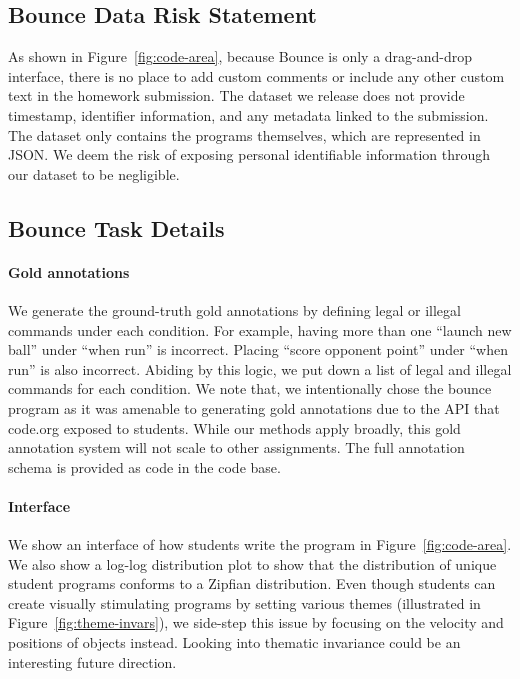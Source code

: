 \documentclass{article}
\begin{document}
\subsection{Bounce Data Risk Statement}
\label{sec:data-security}

As shown in Figure~\ref{fig:code-area}, because Bounce is only a drag-and-drop interface, there is no place to add custom comments or include any other custom text in the homework submission. The dataset we release does not provide timestamp, identifier information, and any metadata linked to the submission. The dataset only contains the programs themselves, which are represented in JSON. We deem the risk of exposing personal identifiable information through our dataset to be negligible.

\subsection{Bounce Task Details}

\paragraph{Gold annotations} 
We generate the ground-truth gold annotations by defining legal or illegal commands under each condition. For example, having more than one ``launch new ball'' under ``when run'' is incorrect. Placing ``score opponent point'' under ``when run'' is also incorrect. Abiding by this logic, we put down a list of legal and illegal commands for each condition.  We note that, we intentionally chose the bounce program as it was amenable to generating gold annotations due to the API that code.org exposed to students. While our methods apply broadly, this gold annotation system will not scale to other assignments. The full annotation schema is provided as code in the code base.

\paragraph{Interface}

We show an interface of how students write the program in Figure~\ref{fig:code-area}. We also show a log-log distribution plot to show that the distribution of unique student programs conforms to a Zipfian distribution. Even though students can create visually stimulating programs by setting various themes (illustrated in Figure~\ref{fig:theme-invars}), we side-step this issue by focusing on the velocity and positions of objects instead. Looking into thematic invariance could be an interesting future direction.
\end{document}
